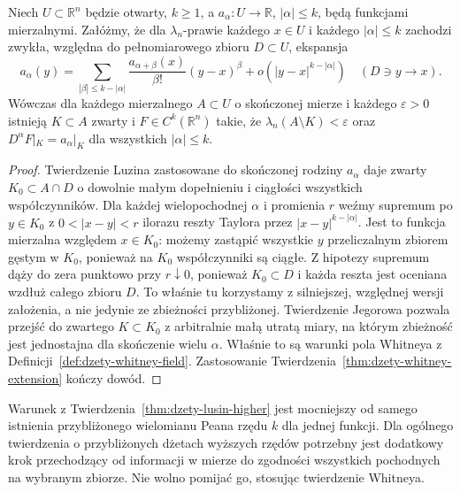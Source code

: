 \begin{twierdzenie}
\label{thm:dzety-lusin-higher}
Niech $U\subset\mathbb R^n$ będzie otwarty, $k\ge1$,
a $a_\alpha:U\to\mathbb R$, $|\alpha|\le k$,
będą funkcjami mierzalnymi. Załóżmy, że dla
$\lambda_n$-prawie każdego $x\in U$ i każdego
$|\alpha|\le k$ zachodzi zwykła, względna do
pełnomiarowego zbioru $D\subset U$, ekspansja
\[
 a_\alpha(y)=\sum_{|\beta|\le k-|\alpha|}
 \frac{a_{\alpha+\beta}(x)}{\beta!}(y-x)^\beta
 +o(|y-x|^{k-|\alpha|})\quad(D\ni y\to x).
\]
Wówczas dla każdego mierzalnego $A\subset U$
o skończonej mierze i każdego $\varepsilon>0$
istnieją $K\subset A$ zwarty i
$F\in C^k(\mathbb R^n)$ takie, że
$\lambda_n(A\setminus K)<\varepsilon$ oraz
$D^\alpha F|_K=a_\alpha|_K$ dla wszystkich
$|\alpha|\le k$.
\end{twierdzenie}
\begin{proof}
Twierdzenie Luzina zastosowane do skończonej rodziny
$a_\alpha$ daje zwarty $K_0\subset A\cap D$ o dowolnie
małym dopełnieniu i ciągłości wszystkich współczynników.
Dla każdej wielopochodnej $\alpha$ i promienia $r$
weźmy supremum po $y\in K_0$ z $0<|x-y|<r$
ilorazu reszty Taylora przez $|x-y|^{k-|\alpha|}$.
Jest to funkcja mierzalna względem $x\in K_0$:
możemy zastąpić wszystkie $y$ przeliczalnym zbiorem
gęstym w $K_0$, ponieważ na $K_0$ współczynniki
są ciągłe. Z hipotezy supremum dąży do zera punktowo przy
$r\downarrow0$, ponieważ $K_0\subset D$ i każda
reszta jest oceniana wzdłuż całego zbioru $D$.
To właśnie tu korzystamy z silniejszej, względnej
wersji założenia, a nie jedynie ze zbieżności przybliżonej. Twierdzenie Jegorowa
pozwala przejść do zwartego $K\subset K_0$ z
arbitralnie małą utratą miary, na którym zbieżność
jest jednostajna dla skończenie wielu $\alpha$.
Właśnie to są warunki pola Whitneya z
Definicji~\ref{def:dzety-whitney-field}. Zastosowanie
Twierdzenia~\ref{thm:dzety-whitney-extension}
kończy dowód.
\end{proof}

\begin{uwaga}
Warunek z Twierdzenia~\ref{thm:dzety-lusin-higher}
jest mocniejszy od samego istnienia przybliżonego
wielomianu Peana rzędu $k$ dla jednej funkcji.
Dla ogólnego twierdzenia o przybliżonych dżetach
wyższych rzędów potrzebny jest dodatkowy krok
przechodzący od informacji w mierze do zgodności
wszystkich pochodnych na wybranym zbiorze.
Nie wolno pomijać go, stosując twierdzenie Whitneya.
\end{uwaga}

